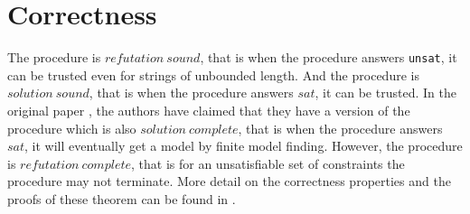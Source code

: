 \section{Correctness}
\label{sec:Correctness}
The procedure is $refutation\ sound$, that is when the procedure answers \texttt{unsat}, it can be trusted even for strings of unbounded length. And the procedure is $solution\ sound$, that is when the procedure answers $sat$, it can be trusted. In the original paper \cite{main-paper}, the authors have claimed that they have a version of the procedure which is also $solution\ complete$, that is when the procedure answers $sat$, it will eventually get a model by finite model finding. However, the procedure  is $refutation\ complete$, that is for an unsatisfiable set of constraints the procedure may not terminate. More detail on the correctness properties and the proofs of these theorem can be found in \cite{main_phd}.